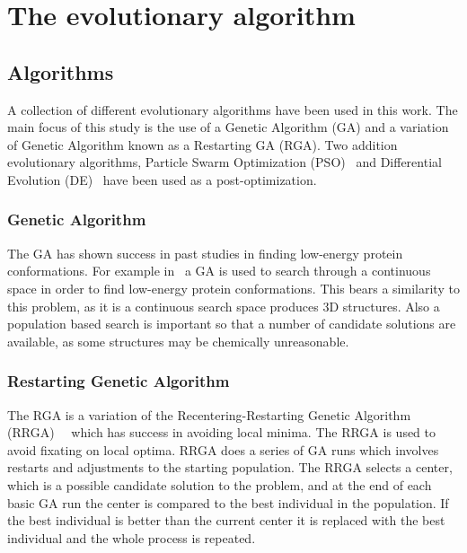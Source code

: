 \documentclass[conference]{IEEEtran}
\begin{document}

\section{The evolutionary algorithm}

\subsection{Algorithms}

A collection of different evolutionary algorithms have been used in this work. The main focus of this study is the use of a Genetic Algorithm (GA) and a variation of Genetic Algorithm known as a Restarting GA (RGA). Two addition evolutionary algorithms, Particle Swarm Optimization (PSO)~\cite{kennedy2010particle} and Differential Evolution (DE)~\cite{storn1997differential} have been used as a post-optimization.

\subsubsection{Genetic Algorithm}

The GA has shown success in past studies in finding low-energy protein conformations. For example in~\cite{comte2010bioinspired} a GA is used to search through a continuous space in order to find low-energy protein conformations. This bears a similarity to this problem, as it is a continuous search space produces 3D structures. Also a population based search is important so that a number of candidate solutions are available, as some structures may be chemically unreasonable.

\subsubsection{Restarting Genetic Algorithm}

The RGA is a variation of the Recentering-Restarting Genetic Algorithm (RRGA)~\cite{hughes2013recentering}~\cite{hughes2013edit} which has success in avoiding local minima. The RRGA is used to avoid fixating on local optima. RRGA does a series of GA runs which involves restarts and adjustments to the starting population. The RRGA selects a center, which is a possible candidate solution to the problem, and at the end of each basic GA run the center is compared to the best individual in the population. If the best individual is better than the current center it is replaced with the best individual and the whole process is repeated.
\end{document}
